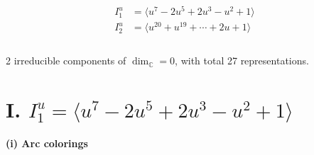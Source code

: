 \documentclass[1p]{elsarticle_modified}
\theoremstyle{definition}
\begin{document}
\begin{align*}
I^u_{1}&=\langle 
u^7-2 u^5+2 u^3- u^2+1\rangle \\
I^u_{2}&=\langle 
u^{20}+u^{19}+\cdots+2 u+1\rangle \\
\\
\end{align*}
\raggedright * 2 irreducible components of $\dim_{\mathbb{C}}=0$, with total 27 representations.\\
\newpage
\renewcommand{\arraystretch}{1}
\centering \section*{I. $I^u_{1}= \langle u^7-2 u^5+2 u^3- u^2+1 \rangle$}
\flushleft \textbf{(i) Arc colorings}\\
\end{document}
